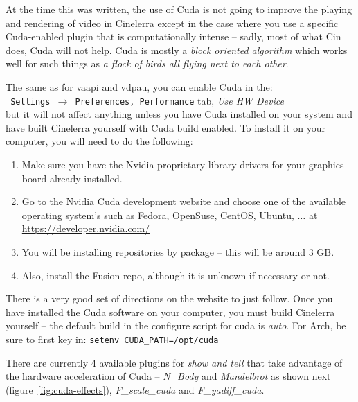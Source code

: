 At the time this was written, the use of Cuda is not going to improve the playing and rendering of video in Cinelerra except in the case where you use a specific Cuda-enabled plugin that is computationally intense -- sadly, most of what Cin does, Cuda will not help.  Cuda is mostly a \textit{block oriented algorithm} which works well for such things as \textit{a flock of birds all flying next to each other}.

The same as for vaapi and vdpau, you can enable Cuda in the:\\
\texttt{ Settings $\rightarrow$ Preferences, Performance} tab, \textit{Use HW Device}\\
but it will not affect anything unless you have Cuda installed on your system and have built Cinelerra yourself with Cuda build enabled.  To install it on your computer, you will need to do the following:

\begin{enumerate}
	\item Make sure you have the Nvidia proprietary library drivers for your graphics board already installed.
	\item Go to the Nvidia Cuda development website and choose one of the available operating system’s
	such as Fedora, OpenSuse, CentOS, Ubuntu, $\dots$ at   {\small \url{https://developer.nvidia.com/}}
	\item You will be installing repositories by package -- this will be around 3 GB.
	\item Also, install the Fusion repo, although it is unknown if necessary or not.
\end{enumerate}

There is a very good set of directions on the website to just follow.  Once you have installed the Cuda software on your computer, you must build Cinelerra yourself -- the default build in the configure script for cuda is \textit{auto}.  For Arch, be sure to first key in:     \texttt{setenv CUDA\_PATH=/opt/cuda} 

There are currently 4 available plugins for \textit{show and tell} that take advantage of the hardware acceleration of Cuda -- \textit{N\_Body} and \textit{Mandelbrot} as shown next (figure~\ref{fig:cuda-effects}), \textit{F\_scale\_cuda} and \textit{F\_yadiff\_cuda}.

